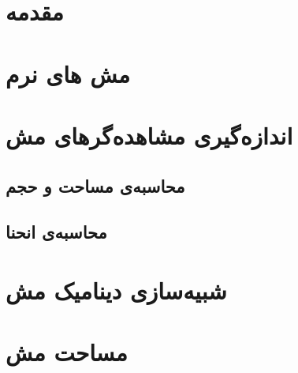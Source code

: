 \setRL
\clearpage
\def \MemRes {\Mempath /MembraneResults}

\section{
مقدمه
}


\section{\label{sec:Soft meshes}
مش های نرم
}






\section{\label{sec:MeshObservables}
اندازه‌گیری مشاهده‌گر‌های مش
}
\subsection{\label{sec:areaVolumeCalculation}
محاسبه‌ی مساحت و حجم
}


%


\subsection{\label{sec:curvatureCalculation}
محاسبه‌ی انحنا
}


\section{\label{sec:Results DAR MD}
شبیه‌سازی دینامیک مش
}










%


\section{\label{sec:resultsArea}
مساحت مش
}




